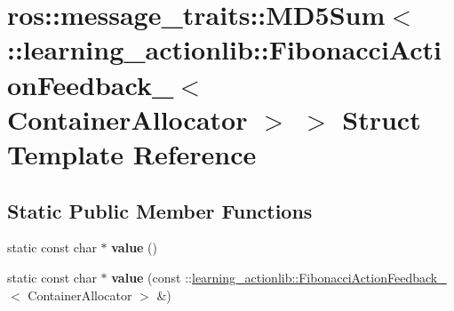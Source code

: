 \hypertarget{structros_1_1message__traits_1_1MD5Sum_3_01_1_1learning__actionlib_1_1FibonacciActionFeedback___0b210292b08bbb91faddcdd7d543e740}{}\section{ros\+:\+:message\+\_\+traits\+:\+:M\+D5\+Sum$<$ \+:\+:learning\+\_\+actionlib\+:\+:Fibonacci\+Action\+Feedback\+\_\+$<$ Container\+Allocator $>$ $>$ Struct Template Reference}
\label{structros_1_1message__traits_1_1MD5Sum_3_01_1_1learning__actionlib_1_1FibonacciActionFeedback___0b210292b08bbb91faddcdd7d543e740}
\subsection*{Static Public Member Functions}
\begin{DoxyCompactItemize}
\item 
\mbox{\label{structros_1_1message__traits_1_1MD5Sum_3_01_1_1learning__actionlib_1_1FibonacciActionFeedback___0b210292b08bbb91faddcdd7d543e740_a2f42facce9074456a590b3b79e0dfb62}} 
static const char $\ast$ {\bfseries value} ()
\item 
\mbox{\label{structros_1_1message__traits_1_1MD5Sum_3_01_1_1learning__actionlib_1_1FibonacciActionFeedback___0b210292b08bbb91faddcdd7d543e740_a38bb9580589c972df66527d9b2d492e7}} 
static const char $\ast$ {\bfseries value} (const \+::\hyperlink{structlearning__actionlib_1_1FibonacciActionFeedback__}{learning\+\_\+actionlib\+::\+Fibonacci\+Action\+Feedback\+\_\+}$<$ Container\+Allocator $>$ \&)
\end{DoxyCompactItemize}
